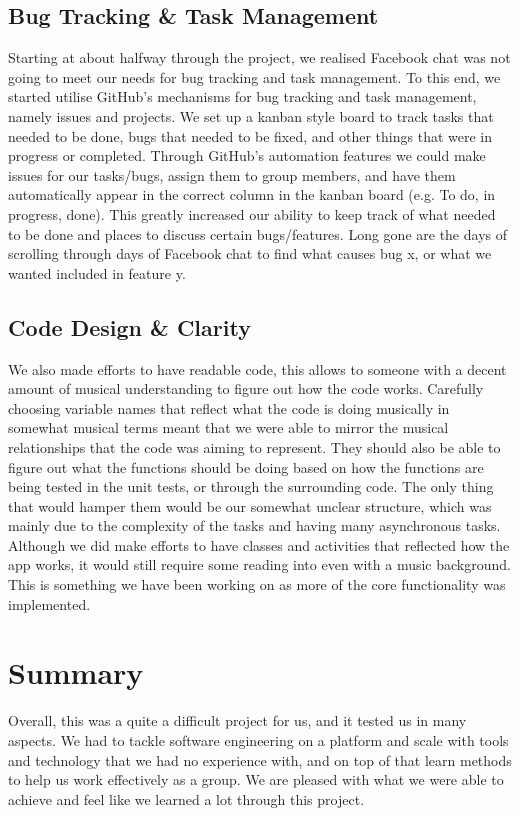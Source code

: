 \documentclass[10pt,a4paper]{article}
\begin{document}
\subsection{Bug Tracking \& Task Management}
Starting at about halfway through the project, we realised Facebook chat was not going to meet our needs for bug tracking and task management. To this end, we started utilise GitHub’s mechanisms for bug tracking and task management, namely issues and projects. We set up a kanban style board to track tasks that needed to be done, bugs that needed to be fixed, and other things that were in progress or completed. Through GitHub’s automation features we could make issues for our tasks/bugs, assign them to group members, and have them automatically appear in the correct column in the kanban board (e.g. To do, in progress, done). This greatly increased our ability to keep track of what needed to be done and places to discuss certain bugs/features. Long gone are the days of scrolling through days of Facebook chat to find what causes bug x, or what we wanted included in feature y.
\subsection{Code Design \& Clarity}
We also made efforts to have readable code, this allows to someone with a decent amount of musical understanding to figure out how the code works. Carefully choosing variable names that reflect what the code is doing musically in somewhat musical terms meant that we were able to mirror the musical relationships that the code was aiming to represent. They should also be able to figure out what the functions should be doing based on how the functions are being tested in the unit tests, or through the surrounding code. The only thing that would hamper them would be our somewhat unclear structure, which was mainly due to the complexity of the tasks and having many asynchronous tasks. Although we did make efforts to have classes and activities that reflected how the app works, it would still require some reading into even with a music background. This is something we have been working on as more of the core functionality was implemented.

\section{Summary}
Overall, this was a quite a difficult project for us, and it tested us in many aspects. We had to tackle software engineering on a platform and scale with tools and technology that we had no experience with, and on top of that learn methods to help us work effectively as a group. We are pleased with what we were able to achieve and feel like we learned a lot through this project.
\end{document}
